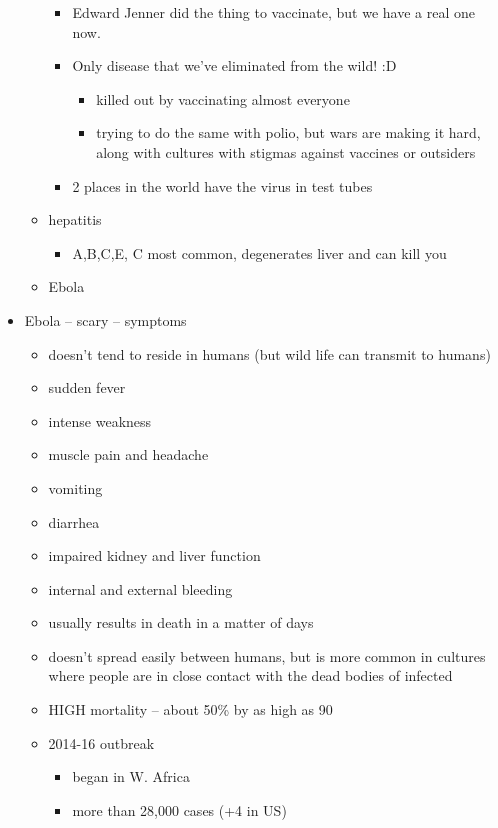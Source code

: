 \documentclass{article}
\theoremstyle{definition}
\begin{document}
\begin{itemize}
\begin{itemize}
				\begin{itemize}
					\item Edward Jenner did the thing to vaccinate, but we have a real one now.
					\item Only disease that we've eliminated from the wild! :D
						\begin{itemize}
							\item killed out by vaccinating almost everyone
							\item trying to do the same with polio, but wars are making it hard, along with cultures with stigmas against vaccines or outsiders
						\end{itemize}
					\item 2 places in the world have the virus in test tubes
				\end{itemize}
			\item hepatitis
				\begin{itemize}
					\item A,B,C,E, C most common, degenerates liver and can kill you
				\end{itemize}
			\item Ebola
		\end{itemize}
	\item Ebola -- scary -- symptoms
		\begin{itemize}
			\item doesn't tend to reside in humans (but wild life can transmit to humans)
			\item sudden fever
			\item intense weakness
			\item muscle pain and headache
			\item vomiting
			\item diarrhea
			\item impaired kidney and liver function
			\item internal and external bleeding
			\item usually results in death in a matter of days
			\item doesn't spread easily between humans, but is more common in cultures where people are in close contact with the dead bodies of infected
			\item HIGH  mortality -- about 50\% by as high as 90
			\item 2014-16 outbreak
				\begin{itemize}
					\item began in W. Africa
					\item more than 28,000 cases (+4 in US)

\end{itemize}
\end{itemize}
\end{itemize}
\end{document}
